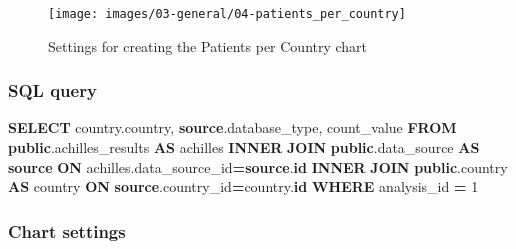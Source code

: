 \documentclass[
]{book}
\newenvironment{Shaded}{\begin{snugshade}}{\end{snugshade}}
\newcommand{\DecValTok}[1]{\textcolor[rgb]{0.00,0.00,0.81}{#1}}
\newcommand{\KeywordTok}[1]{\textcolor[rgb]{0.13,0.29,0.53}{\textbf{#1}}}
\newcommand{\NormalTok}[1]{#1}
\newcommand{\OperatorTok}[1]{\textcolor[rgb]{0.81,0.36,0.00}{\textbf{#1}}}
\begin{document}
\begin{figure}
\texttt{[image: images/03-general/04-patients\_per\_country]} \caption{Settings for creating the Patients per Country chart}\label{fig:patientsPerCountry}
\end{figure}

\hypertarget{patientsPerCountryQuery}{%
\subsubsection*{SQL query}\label{patientsPerCountryQuery}}

\begin{Shaded}
\begin{Highlighting}[]
\KeywordTok{SELECT}\NormalTok{ country.country,}
       \KeywordTok{source}\NormalTok{.database\_type,}
\NormalTok{       count\_value}
\KeywordTok{FROM} \KeywordTok{public}\NormalTok{.achilles\_results }\KeywordTok{AS}\NormalTok{ achilles}
\KeywordTok{INNER} \KeywordTok{JOIN} \KeywordTok{public}\NormalTok{.data\_source }\KeywordTok{AS} \KeywordTok{source}
  \KeywordTok{ON}\NormalTok{ achilles.data\_source\_id}\OperatorTok{=}\KeywordTok{source}\NormalTok{.}\KeywordTok{id}
\KeywordTok{INNER} \KeywordTok{JOIN} \KeywordTok{public}\NormalTok{.country }\KeywordTok{AS}\NormalTok{ country}
  \KeywordTok{ON} \KeywordTok{source}\NormalTok{.country\_id}\OperatorTok{=}\NormalTok{country.}\KeywordTok{id}
\KeywordTok{WHERE}\NormalTok{ analysis\_id }\OperatorTok{=} \DecValTok{1}
\end{Highlighting}
\end{Shaded}

\hypertarget{chart-settings-3}{%
\subsubsection*{Chart settings}\label{chart-settings-3}}
\end{document}
